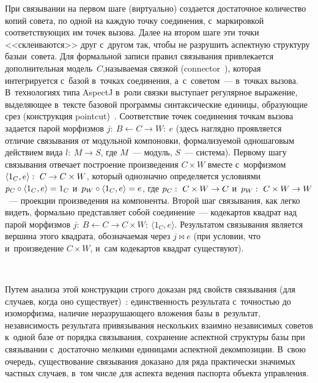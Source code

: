 \begin{multicols}{2}
   При связывании на первом шаге (виртуально) создается достаточное 
количество копий совета, по одной на каждую точку соединения, 
с~маркировкой соответствующих им точек вызова. Далее на втором шаге эти 
точки <<склеиваются>> друг с~другом так, чтобы не разрушить аспектную 
структуру базы\linebreak и~совета. Для формальной записи правил связы\-вания 
привлекается дополнительная модель~$C$,\linebreak на\-зы\-ва\-емая связкой 
(connector~\cite{34-kov}), которая интегрируется с~базой в~точках соединения, 
а~с~советом~--- в~точках вызова. В~технологиях типа AspectJ в~роли связки 
выступает регулярное выражение, выделяющее в~тексте базовой программы 
синтаксические единицы, образующие срез (конструкция  
pointcut)~\cite{18-kov}. Соответствие точек соединения точкам вызова задается 
парой морфизмов $j:\ B\leftarrow C\rightarrow W:\ e$ (здесь наглядно 
проявляется отличие связывания от модульной компоновки, формализуемой 
одношаговым действием вида $l:\ M\rightarrow S$, где $M$~--- модуль, $S$~--- 
система). Первому шагу связывания отвечает построение произведения 
$C\times W$ вместе с~морфизмом $\langle 1_C,e\rangle:\ C\hm\to C\times W$, 
который однозначно определяется условиями $p_C\circ \langle 1_C, 
e\rangle\hm=1_C$ и~$p_W\circ \langle 1_C,e\rangle \hm=e$, где $p_C:\ C\times 
W\hm\to C$ и~$p_W:\ C\times W\hm\to W$~--- проекции произведения на 
компоненты. Второй шаг связывания, как легко видеть, формально 
пред\-став\-ля\-ет собой соединение~--- кодекартов квад\-рат над парой морфизмов 
$j:\ B\leftarrow C\rightarrow C\times W:\ \langle 1_C,e\rangle$. Результатом 
связывания является вершина этого квад\-ра\-та, обозначаемая через $j\bowtie e$ 
(при условии, что и~произведение $C\times W$, и~сам кодекартов квадрат 
существуют).
   
 \begin{center}
 \mbox{%
 \epsfxsize=41.246mm
 }
 \end{center}
   
   Путем анализа этой конструкции строго доказан ряд свойств связывания 
(для случаев, когда оно существует)~\cite{20-kov}: единственность результата 
с~точностью до изоморфизма, наличие неразрушающего вложения базы 
в~результат, независимость результата привязывания нескольких взаимно 
независимых советов к~одной базе от порядка связывания, сохранение 
аспектной структуры базы при связывании с~достаточно мелкими единицами 
аспектной декомпозиции. В~свою очередь, существование связывания доказано 
для ряда практически значимых частных случаев, в~том числе для аспекта 
ведения паспорта объекта управления.
   

\end{multicols}
